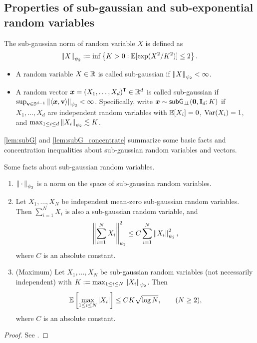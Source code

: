 \subsection{Properties of sub-gaussian and sub-exponential random variables}

\begin{defn}
    \label{def:subgauss}
    The sub-gaussian norm of random variable $X$ is defined as
    \begin{equation*}
        \left\|{X}\right\|_{\psi_2} := \inf\left\{ K > 0: \mathbb{E}[\exp(X^2/K^2)] \le 2 \right\}.
    \end{equation*}
    \begin{itemize}
        \item A random variable $X \in \mathbb{R}$ is called sub-gaussian if $\left\|{X}\right\|_{\psi_2} < \infty$.
        \item A random vector $\text{\boldmath $x$} = (X_1, \dots, X_d)^{\sf T} \in \mathbb{R}^d$ is called sub-gaussian if $\sup_{\mathrm{\bf v} \in \mathbb{S}^{d-1}}\left\|{\langle \text{\boldmath $x$}, \mathrm{\bf v} \rangle}\right\|_{\psi_2} < \infty$. Specifically, write $\text{\boldmath $x$} \sim {\sf{subG}_{\perp\!\!\!\perp}}(\mathrm{\bf 0}, \mathrm{\bf I}_d; K)$ if
        $X_1, \dots, X_d$ are independent random variables with $\mathbb{E}[X_i] = 0$, $\mathrm{Var}(X_i) = 1$,
        and $\max_{1 \le i \le d} \left\|{X_i}\right\|_{\psi_2} \lesssim K$. 
    \end{itemize}   
\end{defn}

\noindent
\cref{lem:subG} and \ref{lem:subG_concentrate} summarize some basic facts and concentration inequalities about sub-gaussian random variables and vectors.

\begin{lem}\label{lem:subG}
    Some facts about sub-gaussian 
    random variables.
    \begin{enumerate}[label=(\alph*)]
        \item \label{lem:subG-a} $\left\|{\, \cdot \,}\right\|_{\psi_2}$ is a norm on the space of sub-gaussian random variables.
        \item \label{lem:subG-b} Let $X_1, \ldots, X_N$ be independent mean-zero sub-gaussian random variables. Then $\sum_{i=1}^N X_i$ is also a sub-gaussian random variable, and
        \[ \left\|{\sum_{i=1}^N X_i}\right\|_{\psi_2}^2\le C \sum_{i=1}^N \left\|{X_i}\right\|^2_{\psi_2}, \]
        where $C$ is an absolute constant.
        \item \label{lem:subG-c} (Maximum) Let $X_1, \ldots, X_N$ be sub-gaussian random variables (not necessarily independent) with $K := \max_{1 \le i \le N} \left\|{X_i}\right\|_{\psi_2}$. Then
        \[ \mathbb{E}\left[ \max_{1 \le i \le N} \left|{X_i}\right| \right] \le  C K \sqrt{\log N},
        \qquad (N \ge 2), \]
        where $C$ is an absolute constant.
    \end{enumerate}
\end{lem}
\begin{proof}
    See \cite[Exercise 2.5.7, Proposition 2.6.1, Exercise 2.5.10]{vershynin2018high}.
\end{proof}

